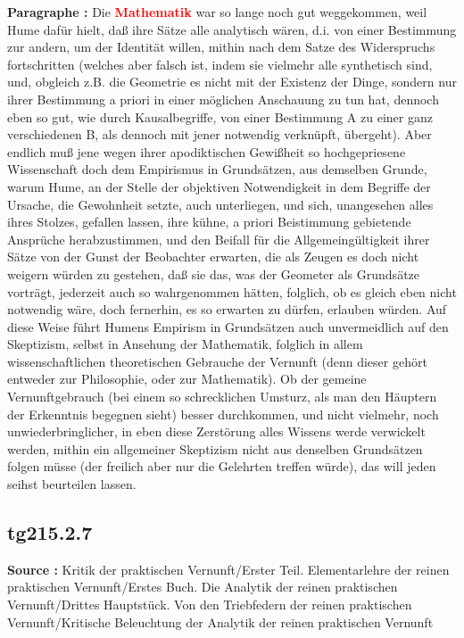 \documentclass[a4paper,12pt,twoside]{book}
\newcommand{\match}[1]{\textcolor{red}{\textbf{#1}}}
\begin{document}
	\textbf{Paragraphe : }Die \match{Mathematik} war so lange noch gut weggekommen, weil Hume dafür hielt, daß ihre Sätze alle analytisch wären, d.i. von einer Bestimmung zur andern, um der Identität willen, mithin nach dem Satze des Widerspruchs fortschritten (welches aber falsch ist, indem sie vielmehr alle synthetisch sind, und, obgleich z.B. die Geometrie es nicht mit der Existenz der Dinge, sondern nur ihrer Bestimmung a priori in einer möglichen Anschauung zu tun hat, dennoch eben so gut, wie durch Kausalbegriffe, von einer Bestimmung A zu einer ganz verschiedenen B, als dennoch mit jener notwendig verknüpft, übergeht). Aber endlich muß jene wegen ihrer apodiktischen Gewißheit so hochgepriesene Wissenschaft doch dem Empirismus in Grundsätzen, aus demselben Grunde, warum Hume, an der Stelle der objektiven Notwendigkeit in dem Begriffe der Ursache, die Gewohnheit setzte, auch unterliegen, und sich, unangesehen alles ihres Stolzes, gefallen lassen, ihre kühne, a priori Beistimmung gebietende Ansprüche herabzustimmen, und den Beifall für die Allgemeingültigkeit ihrer Sätze von der Gunst der Beobachter erwarten, die als Zeugen es doch nicht weigern würden zu gestehen, daß sie das, was der Geometer als Grundsätze vorträgt, jederzeit auch so wahrgenommen hätten,  folglich, ob es gleich eben nicht notwendig wäre, doch fernerhin, es so erwarten zu dürfen, erlauben würden. Auf diese Weise führt Humens Empirism in Grundsätzen auch unvermeidlich auf den Skeptizism, selbst in Ansehung der Mathematik, folglich in allem wissenschaftlichen theoretischen Gebrauche der Vernunft (denn dieser gehört entweder zur Philosophie, oder zur Mathematik). Ob der gemeine Vernunftgebrauch (bei einem so schrecklichen Umsturz, als man den Häuptern der Erkenntnis begegnen sieht) besser durchkommen, und nicht vielmehr, noch unwiederbringlicher, in eben diese Zerstörung alles Wissens werde verwickelt werden, mithin ein allgemeiner Skeptizism nicht aus denselben Grundsätzen folgen müsse (der freilich aber nur die Gelehrten treffen würde), das will jeden seihst beurteilen lassen. 
	
	\subsection*{tg215.2.7} 
	\textbf{Source : }Kritik der praktischen Vernunft/Erster Teil. Elementarlehre der reinen praktischen Vernunft/Erstes Buch. Die Analytik der reinen praktischen Vernunft/Drittes Hauptstück. Von den Triebfedern der reinen praktischen Vernunft/Kritische Beleuchtung der Analytik der reinen praktischen Vernunft\\  
	
\end{document}
